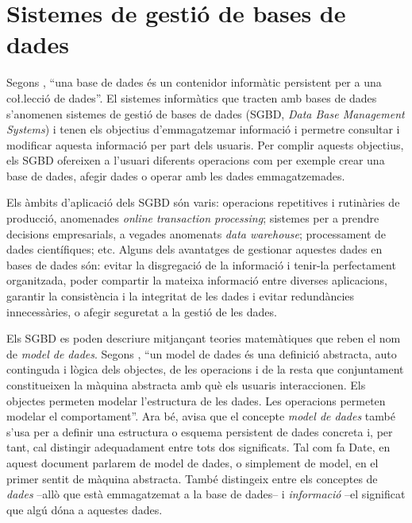 \section{Sistemes de gestió de bases de dades}
\label{sec:art:sgbd}


Segons \textcite{date:introduction}, ``una base de dades és un
contenidor informàtic persistent per a una co\l.lecció de dades''. El
sistemes informàtics que tracten amb bases de dades s'anomenen
sistemes de gestió de bases de dades (SGBD, \emph{Data Base Management
  Systems}) i tenen els objectius d'emmagatzemar informació i permetre
consultar i modificar aquesta informació per part dels usuaris.  Per
complir aquests objectius, els SGBD ofereixen a l'usuari diferents
operacions com per exemple crear una base de dades, afegir dades o
operar amb les dades emmagatzemades. 

Els àmbits d'aplicació dels SGBD són varis: operacions repetitives
i rutinàries de producció, anomenades \emph{online transaction
  processing}; sistemes per a prendre decisions empresarials, a
vegades anomenats \emph{data warehouse}; processament de dades
científiques; etc.  Alguns dels avantatges de gestionar aquestes dades
en bases de dades són: evitar la disgregació de la informació i
tenir-la perfectament organitzada, poder compartir la mateixa
informació entre diverses aplicacions, garantir la consistència i la
integritat de les dades i evitar redundàncies innecessàries, o afegir
seguretat a la gestió de les dades.


Els SGBD es poden descriure mitjançant teories matemàtiques que reben
el nom de \emph{model de dades}.  Segons
\citeauthor{date:introduction}, ``un model de dades és una definició
abstracta, auto continguda i lògica dels objectes, de les operacions i
de la resta que conjuntament constitueixen la màquina abstracta amb
què els usuaris interaccionen. Els objectes permeten modelar
l'estructura de les dades. Les operacions permeten modelar el
comportament''. Ara bé, \citeauthor{date:introduction} avisa que el
concepte \emph{model de dades} també s'usa per a definir una
estructura o esquema persistent de dades concreta i, per tant, cal distingir
adequadament entre tots dos significats.  Tal com fa Date, en aquest
document parlarem de model de dades, o simplement de model, en el
primer sentit de màquina abstracta. També distingeix entre els
conceptes de \emph{dades} --allò que està emmagatzemat a la base de
dades-- i \emph{informació} --el significat que algú dóna a aquestes
dades.


